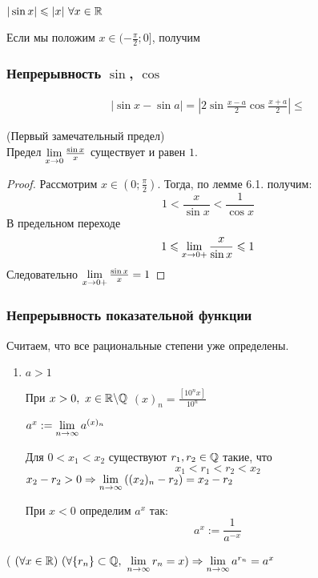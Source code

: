 \begin{corollary}
	$|\sin x| \leqslant |x|\ \forall x \in \mathbb{R}$
	
	Если мы положим $x \in (-\frac{\pi}{2}; 0]$, получим
	
\end{corollary}

\subsubsection*{Непрерывность $\sin$, $\cos$}

\begin{align*}
	|\sin x - \sin a| = |2 \sin \frac{x - a}{2} \cos \frac{x + a}{2}| \le 
\end{align*}

\begin{theorem} (Первый замечательный предел) \\
	Предел $\lim\limits_{x \to 0} \frac{\sin x}{x}$ существует и равен $1$.
\end{theorem}

\begin{proof}
	Рассмотрим $x \in (0; \frac{\pi}{2})$. Тогда, по лемме 6.1. получим:
	$$
		1 < \frac{x}{\sin x} < \frac{1}{\cos x}
	$$
	В предельном переходе
	$$
		1 \leqslant \lim\limits_{x \to 0+} \frac{x}{\sin x} \leqslant 1
	$$
	Следовательно $\lim\limits_{x \to 0+} \frac{\sin x}{x} = 1$
\end{proof}

\subsubsection*{Непрерывность показательной функции}

Считаем, что все рациональные степени уже определены.

\begin{enumerate}
	\item $a > 1$
	
	При $x > 0,\ x \in \mathbb{R} \backslash \mathbb{Q}$ $(x)_n = \frac{[10^n x]}{10^n}$
	
	$a^x := \lim\limits_{n \to \infty} a^{(x)_n}$
	
	Для $0 < x_1 < x_2$ существуют $r_1, r_2 \in \mathbb{Q}$ такие, что
	$$
		x_1 < r_1 < r_2 < x_2
	$$
	$x_2 - r_2 > 0 \Rightarrow \lim\limits_{n \to \infty} \left((x_2)_n - r_2\right) = x_2 - r_2$
	
	При $x < 0$ определим $a^x$ так:
	$$
		a^x := \frac{1}{a^{-x}}
	$$
\end{enumerate}

\begin{lemma}(
	$(\forall x \in \mathbb{R})\ (\forall \{r_n\} \subset \mathbb{Q},\ \lim\limits_{n \to \infty} r_n = x) \Rightarrow \lim\limits_{n \to \infty} a^{r_n} = a^x$
\end{lemma}

